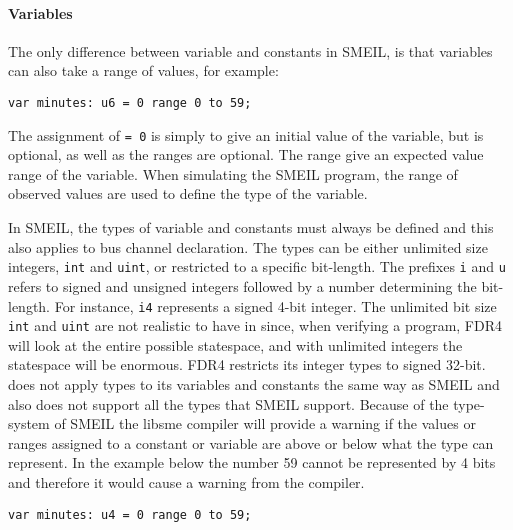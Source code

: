\paragraph{Variables}
The only difference between variable and constants in SMEIL, is that variables can also take a range of values, for example:
\begin{verbatim}
var minutes: u6 = 0 range 0 to 59;
\end{verbatim}
The assignment of \texttt{= 0} is simply to give an initial value of the variable, but is optional, as well as the ranges are optional. The range give an expected value range of the variable. When simulating the SMEIL program, the range of observed values are used to define the type of the variable.

In SMEIL, the types of variable and constants must always be defined and this also applies to bus channel declaration. The types can be either unlimited size integers, \texttt{int} and \texttt{uint}, or restricted to a specific bit-length. The prefixes \texttt{i} and \texttt{u} refers to signed and unsigned integers followed by a number determining the bit-length. For instance, \texttt{i4} represents a signed 4-bit integer.
The unlimited bit size \texttt{int} and \texttt{uint} are not realistic to have in \cspm since, when verifying a program, FDR4 will look at the entire possible statespace, and with unlimited integers the statespace will be enormous. FDR4 restricts its integer types to signed 32-bit\cite{UniversityofOxford}. \cspm does not apply types to its variables and constants the same way as SMEIL and \cspm also does not support all the types that SMEIL support.
Because of the type-system of SMEIL the libsme compiler will provide a warning if the values or ranges assigned to a constant or variable are above or below what the type can represent. In the example below the number 59 cannot be represented by 4 bits and therefore it would cause a warning from the compiler.
\begin{verbatim}
var minutes: u4 = 0 range 0 to 59;
\end{verbatim}

